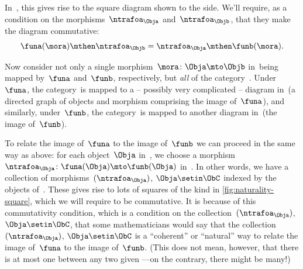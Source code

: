 
%
\begin{marginfigure}
    \hfill
    \caption{}
    \label{fig:naturality-square}
\end{marginfigure}

In~\CatD, this gives rise to the square diagram shown to the side.
We'll require, as a condition on the morphisms~$\ntrafoa_\Obja$ and~$\ntrafoa_\Objb$, that they make the diagram commutative:
\begin{equation}
    \funa(\mora) \mthen \ntrafoa_\Objb = \ntrafoa_\Obja \mthen \funb(\mora).
\end{equation}

Now consider not only a single morphism~$\mora \colon \Obja \mto \Objb$ in~\CatC being mapped by~$\funa$ and~$\funb$, respectively, but \emph{all} of the category~\CatC.
Under~$\funa$, the category~\CatC is mapped to a -- possibly very complicated -- diagram in~\CatD (a directed graph of objects and morphism comprising the image of~$\funa$), and similarly, under~$\funb$, the category~\CatC is mapped to another diagram in~\CatD (the image of~$\funb$).

To relate the image of~$\funa$ to the image of~$\funb$ we can proceed in the same way as above: for each object~$\Obja$ in~\CatC, we choose a morphism~$\ntrafoa_\Obja \colon \funa(\Obja) \mto \funb(\Obja)$ in~\CatD.
In other words, we have a collection of morphisms~$(\ntrafoa_\Obja)$, ${\Obja \setin \ObC}$ indexed by the objects of~\CatC.
These gives rise to lots of squares of the kind in \cref{fig:naturality-square}, which we will require to be commutative.
It is because of this commutativity condition, which is a condition on the collection~$(\ntrafoa_\Obja)$, ${\Obja \setin \ObC}$, that some mathematicians would say that the collection~$(\ntrafoa_\Obja)$, ${\Obja \setin \ObC}$ is a ``coherent'' or ``natural'' way to relate the image of~$\funa$ to the image of~$\funb$.
(This does not mean, however, that there is at most one  between any two given ---on the contrary, there might be many!)

\begin{marginfigure}
    \centering
    \caption{}
    \label{fig:two-naturality-squares}
\end{marginfigure}

